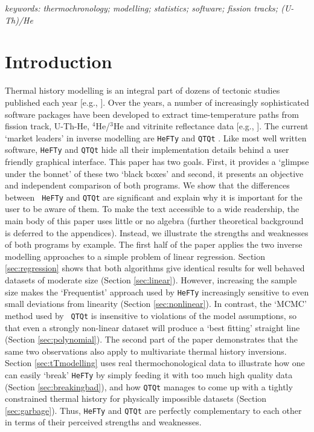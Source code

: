 \documentclass{article}
\begin{document}
\emph{keywords: thermochronology; modelling; statistics; software; 
fission tracks; (U-Th)/He}

\section{Introduction}
\label{sec:intro}

Thermal history modelling is an integral part of dozens of tectonic
studies published each year [e.g., \cite{tian2014, karlstrom2014,
  cochrane2014}]. Over the years, a number of increasingly
sophisticated software packages have been developed to extract
time-temperature paths from fission track, U-Th-He, $^4$He/$^3$He and
vitrinite reflectance data [e.g., \cite{corrigan1991,
  gallagher1995, willett1997, ketcham2000}]. The current `market
leaders' in inverse modelling are {\tt HeFTy} \cite{ketcham2005} and
{\tt QTQt} \cite{gallagher2012}. Like most well written software,
{\tt HeFTy} and {\tt QTQt} hide all their implementation details
behind a user friendly graphical interface. This paper has two
goals. First, it provides a `glimpse under the bonnet' of these two
`black boxes' and second, it presents an objective and independent
comparison of both programs. We show that the differences between {\tt
  HeFTy} and {\tt QTQt} are significant and explain why it is
important for the user to be aware of them. To make the text
accessible to a wide readership, the main body of this paper uses
little or no algebra (further theoretical background is deferred to
the appendices). Instead, we illustrate the strengths and weaknesses
of both programs by example. The first half of the paper applies the
two inverse modelling approaches to a simple problem of linear
regression. Section \ref{sec:regression} shows that both algorithms
give identical results for well behaved datasets of moderate size
(Section \ref{sec:linear}). However, increasing the sample size makes
the `Frequentist' approach used by {\tt HeFTy} increasingly sensitive
to even small deviations from linearity (Section
\ref{sec:nonlinear}). In contrast, the `MCMC' method used by {\tt
  QTQt} is insensitive to violations of the model assumptions, so that
even a strongly non-linear dataset will produce a `best fitting'
straight line (Section \ref{sec:polynomial}). The second part of the
paper demonstrates that the same two observations also apply to
multivariate thermal history inversions. Section \ref{sec:tTmodelling}
uses real thermochonological data to illustrate how one can easily
`break' {\tt HeFTy} by simply feeding it with too much high quality
data (Section \ref{sec:breakingbad}), and how {\tt QTQt} manages to
come up with a tightly constrained thermal history for physically
impossible datasets (Section \ref{sec:garbage}). Thus, {\tt HeFTy} and
{\tt QTQt} are perfectly complementary to each other in terms of their
perceived strengths and weaknesses.
\end{document}
